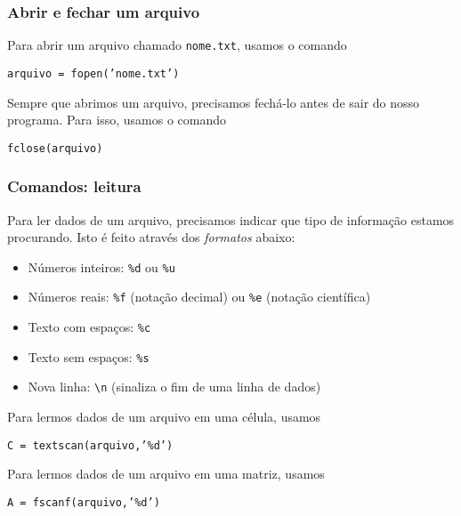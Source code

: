 \documentclass{beamer}
\newcommand{\code}[1]{{\texttt{#1}}}
\newcommand{\acode}[1]{\alert{\texttt{#1}}}
\begin{document}
\begin{frame}
   \frametitle{Abrir e fechar um arquivo}
   Para abrir um arquivo chamado \code{nome.txt}, usamos o comando
   \begin{center}
      \code{arquivo = \acode{fopen}('nome.txt')}
   \end{center}
   \vfill
   Sempre que abrimos um arquivo, precisamos fechá-lo antes de sair do nosso programa. Para isso, usamos o comando
   \begin{center}
      \code{\acode{fclose}(arquivo)}
   \end{center}   
\end{frame}
\begin{frame}
   \frametitle{Comandos: leitura}
   Para ler dados de um arquivo, precisamos indicar que tipo de informação estamos procurando. Isto é feito através dos \emph{formatos} abaixo:
   \begin{itemize}
      \item Números inteiros: \code{\%d} ou \code{\%u}
      \item Números reais: \code{\%f} (notação decimal) ou \code{\%e} (notação científica)
      \item Texto com espaços: \code{\%c}
      \item Texto sem espaços: \code{\%s}
      \item Nova linha: \code{\textbackslash n} (sinaliza o fim de uma linha de dados)
   \end{itemize}

   Para lermos dados de um arquivo em uma célula, usamos
   \begin{center}
      \code{C = \acode{textscan}(arquivo,'\%d')}
   \end{center}
   Para lermos dados de um arquivo em uma matriz, usamos
   \begin{center}
      \code{A = \acode{fscanf}(arquivo,'\%d')}
   \end{center}
\end{frame}
\end{document}
